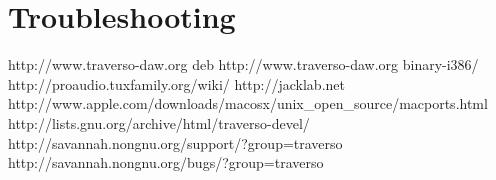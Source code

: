 \documentclass[a4paper,
               12pt,
               pdftex,
               twoside,
               smallheadings,
               headsepline,
               headinclude,
               DIV16,
               BCOR10mm
               ]{scrreprt}
\begin{document}
\chapter{Troubleshooting}


\begin{thebibliography}{xx}
   http://www.traverso-daw.org
   deb http://www.traverso-daw.org binary-i386/
   http://proaudio.tuxfamily.org/wiki/
   http://jacklab.net
   http://www.apple.com/downloads/macosx/unix\_open\_source/macports.html
   http://lists.gnu.org/archive/html/traverso-devel/
   http://savannah.nongnu.org/support/?group=traverso
   http://savannah.nongnu.org/bugs/?group=traverso
\end{thebibliography}
\end{document}
